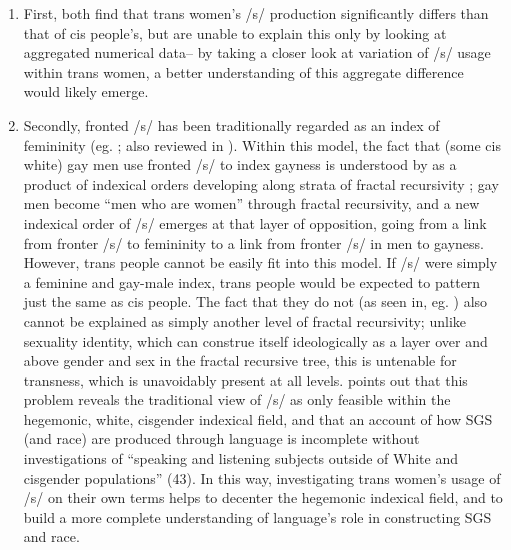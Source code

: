 \documentclass[11pt]{article}
\begin{document}
\begin{enumerate}
\item First, both \textcite{hazenberg_language_2012, podesva_sexuality_2015} find that trans women's /s/ production significantly differs than that of cis people's, but are unable to explain this only by looking at aggregated numerical data-- by taking a closer look at variation of /s/ usage within trans women, a better understanding of this aggregate difference would likely emerge. 

\item Secondly, fronted /s/ has been traditionally regarded as an index of femininity (eg. \cite{campbell-kibler_intersecting_2011, podesva_sexuality_2015, maegaard_s_2015}; also reviewed in \cite{calder_sissy_2019}). Within this model, the fact that (some cis white) gay men use fronted /s/ to index gayness is understood by \textcite{calder_sissy_2019} as a product of indexical orders \parencite[][see]{silverstein_indexical_2003} developing along strata of fractal recursivity \parencite[][see]{kroskrity_language_2000}; gay men become ``men who are women'' through fractal recursivity, and a new indexical order of /s/ emerges at that layer of opposition, going from a link from fronter /s/ to femininity to a link from fronter /s/ in men to gayness. However, trans people cannot be easily fit into this model. If /s/ were simply a feminine and gay-male index, trans people would be expected to pattern just the same as cis people. The fact that they do not (as seen in, eg. \cite{hazenberg_language_2012, podesva_sexuality_2015, zimman_hegemonic_2013}) also cannot be explained as simply another level of fractal recursivity; unlike sexuality identity, which can construe itself ideologically as a layer over and above gender and sex in the fractal recursive tree, this is untenable for transness, which is unavoidably present at all levels. \textcite{calder_whose_2021} points out that this problem reveals the traditional view of /s/ as only feasible within the hegemonic, white, cisgender indexical field, and that an account of how SGS (and race) are produced through language is incomplete without investigations of ``speaking and listening subjects outside of White and cisgender populations'' (43). In this way, investigating trans women's usage of /s/ on their own terms helps to decenter the hegemonic indexical field, and to build a more complete understanding of language's role in constructing SGS and race.


\end{enumerate}
\end{document}
